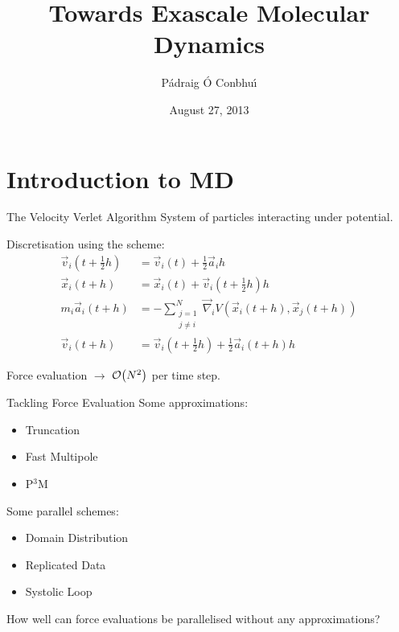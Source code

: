 \documentclass[xcolor={usenames, svgnames}]{beamer}
\title[Exascale MD]{Towards Exascale Molecular Dynamics}
\author[P. O Conbhui]{P\'{a}draig \'{O} Conbhu\'{\i}}
\date[August 2013]{August 27, 2013}
\begin{document}
\begin{frame}[plain]
    \titlepage
\end{frame}



\section{Introduction to MD}


\begin{frame}{The Velocity Verlet Algorithm}
    System of particles interacting under \twobody{} potential.

    Discretisation using the \velocityverlet{} scheme:
    \begin{equation*}
        \begin{split}
            \vec{v}_i(t + \tfrac{1}{2} h) &=
                \vec{v}_i(t) + \tfrac{1}{2}\vec{a}_i h
            \\
            \vec{x}_i(t + h) &=
                \vec{x}_i(t) + \vec{v}_i(t + \tfrac{1}{2} h) h
            \\
            m_i \vec{a}_i(t + h) &=
                - \sum_{\substack{j=1\\j\ne{}i}}^N
                    \vec{\nabla}_i V(\vec{x}_i(t+h), \vec{x}_j(t+h))
            \\
            \vec{v}_i(t+h) &=
                \vec{v}_i(t + \tfrac{1}{2} h) + \tfrac{1}{2} \vec{a}_i(t + h) h
        \end{split}
    \end{equation*}

    Force evaluation $\rightarrow{}$ $\mathcal{O}{\left({ N^2 }\right)}$ per time step.
\end{frame}


\begin{frame}{Tackling Force Evaluation}
    Some approximations:
    \begin{itemize}
        \item Truncation
        \item Fast Multipole
        \item P${}^3$M
    \end{itemize}

    Some parallel schemes:
    \begin{itemize}
        \item Domain Distribution
        \item Replicated Data
        \item Systolic Loop
    \end{itemize}

    How well can force evaluations be parallelised without
    any approximations?
\end{frame}
\end{document}
